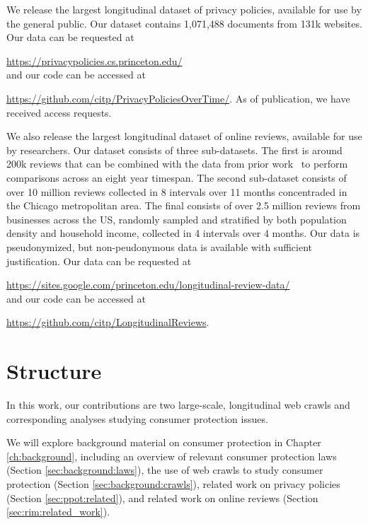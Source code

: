 We release the largest longitudinal dataset of privacy policies, available for use by the general public. Our dataset contains 1,071,488 documents from 131k websites. Our data can be requested at \par
\url{https://privacypolicies.cs.princeton.edu/}\\
 and our code can be accessed at \par
\url{https://github.com/citp/PrivacyPoliciesOverTime/}. As of publication, we have received  access requests.

We also release the largest longitudinal dataset of online reviews, available for use by researchers. Our dataset consists of three sub-datasets. The first is around 200k reviews that can be combined with the data from prior work~\cite{mukherjee2013yelp} to perform comparisons across an eight year timespan. The second sub-dataset consists of over 10 million reviews collected in 8 intervals over 11 months concentraded in the Chicago metropolitan area. The final consists of over 2.5 million reviews from businesses across the US, randomly sampled and stratified by both population density and household income, collected in 4 intervals over 4 months. Our data is pseudonymized, but non-peudonymous data is available with sufficient justification. Our data can be requested at\par
\url{https://sites.google.com/princeton.edu/longitudinal-review-data/}\\
and our code can be accessed at\par
\url{https://github.com/citp/LongitudinalReviews}.




\section{Structure}

In this work, our contributions are two large-scale, longitudinal web crawls and corresponding analyses studying consumer protection issues. 

We will explore background material on consumer protection in Chapter \ref{ch:background}, including an overview of relevant consumer protection laws (Section \ref{sec:background:laws}), the use of web crawls to study consumer protection (Section \ref{sec:background:crawls}), related work on privacy policies (Section \ref{sec:ppot:related}), and related work on online reviews (Section \ref{sec:rim:related_work}).

